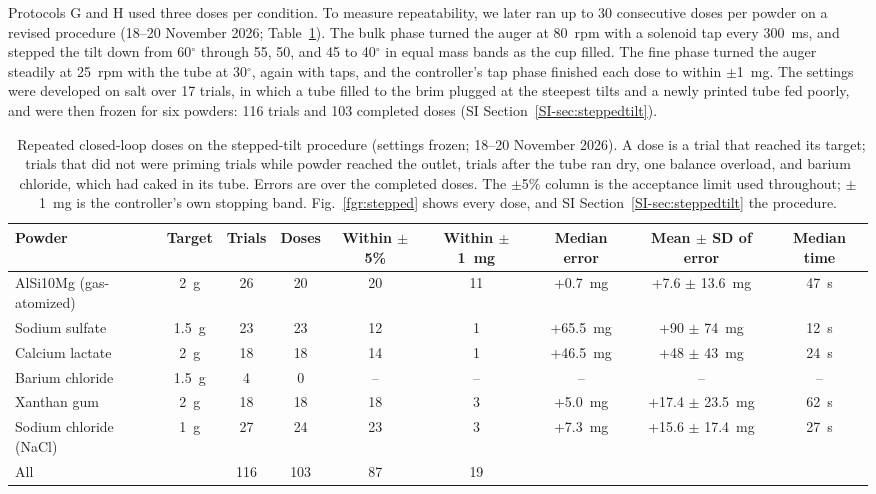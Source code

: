 \documentclass[twoside,twocolumn,9pt]{article}
\newcommand{\siref}[1]{\ref*{SI-#1}}
\begin{document}
Protocols G and H used three doses per condition. To measure repeatability, we later ran up to 30 consecutive doses per powder on a revised procedure (18--20 November 2026; Table~\ref{tbl:stepped}). The bulk phase turned the auger at 80~rpm with a solenoid tap every 300~ms, and stepped the tilt down from 60$^\circ$ through 55, 50, and 45 to 40$^\circ$ in equal mass bands as the cup filled. The fine phase turned the auger steadily at 25~rpm with the tube at 30$^\circ$, again with taps, and the controller's tap phase finished each dose to within $\pm$1~mg. The settings were developed on salt over 17 trials, in which a tube filled to the brim plugged at the steepest tilts and a newly printed tube fed poorly, and were then frozen for six powders: 116 trials and 103 completed doses (SI Section~\siref{sec:steppedtilt}).

\begin{table}[t]
\small
  \caption{\ Repeated closed-loop doses on the stepped-tilt procedure (settings frozen; 18--20 November 2026). A dose is a trial that reached its target; trials that did not were priming trials while powder reached the outlet, trials after the tube ran dry, one balance overload, and barium chloride, which had caked in its tube. Errors are over the completed doses. The $\pm$5\% column is the acceptance limit used throughout; $\pm$1~mg is the controller's own stopping band. Fig.~\ref{fgr:stepped} shows every dose, and SI Section~\siref{sec:steppedtilt} the procedure.}
  \label{tbl:stepped}
  \begin{tabular*}{\textwidth}{@{\extracolsep{\fill}}lcccccccc}
    \hline
    Powder & Target & Trials & Doses & Within $\pm$5\% & Within $\pm$1~mg & Median error & Mean $\pm$ SD of error & Median time \\
    \hline
    AlSi10Mg (gas-atomized) & 2~g & 26 & 20 & 20 & 11 & +0.7~mg & +7.6 $\pm$ 13.6~mg & 47~s \\
    Sodium sulfate & 1.5~g & 23 & 23 & 12 & 1 & +65.5~mg & +90 $\pm$ 74~mg & 12~s \\
    Calcium lactate & 2~g & 18 & 18 & 14 & 1 & +46.5~mg & +48 $\pm$ 43~mg & 24~s \\
    Barium chloride & 1.5~g & 4 & 0 & -- & -- & -- & -- & -- \\
    Xanthan gum & 2~g & 18 & 18 & 18 & 3 & +5.0~mg & +17.4 $\pm$ 23.5~mg & 62~s \\
    Sodium chloride (NaCl) & 1~g & 27 & 24 & 23 & 3 & +7.3~mg & +15.6 $\pm$ 17.4~mg & 27~s \\
    \hline
    All & & 116 & 103 & 87 & 19 & & & \\
    \hline
  \end{tabular*}
\end{table}
\end{document}
